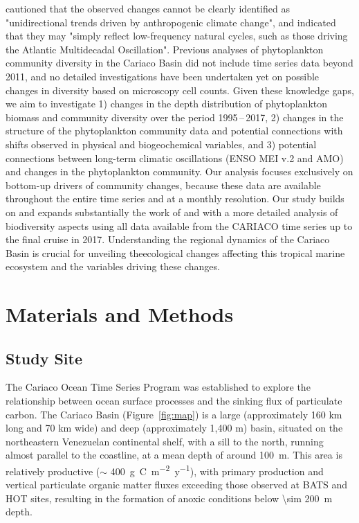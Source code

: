 \documentclass[draft]{agujournal2019}
\begin{document}
     cautioned that the observed changes cannot be clearly identified as "unidirectional trends driven by anthropogenic climate change", and indicated that they may "simply reflect low-frequency natural cycles, such as those driving the Atlantic Multidecadal Oscillation".
    Previous analyses of phytoplankton community diversity in the Cariaco Basin did not include time series data beyond 2011, and no detailed investigations have been undertaken yet on possible changes in diversity based on microscopy cell counts.
    Given these knowledge gaps, we aim to investigate 1) changes in the depth distribution of phytoplankton biomass and community diversity over the period 1995\,--\,2017, 2) changes in the structure of the phytoplankton community data and potential connections with shifts observed in physical and biogeochemical variables, and 3) potential connections between long-term climatic oscillations (ENSO MEI v.2 and AMO)  and changes in the phytoplankton community.
    Our analysis focuses exclusively on bottom-up drivers of community changes, because these data are available throughout the entire time series and at a monthly resolution. Our study builds on and expands substantially the work of  and  with a more detailed analysis of biodiversity aspects using all data available from the CARIACO time series up to the final cruise in 2017. Understanding the regional dynamics of the Cariaco Basin is crucial for unveiling theecological changes affecting this tropical marine ecosystem and the variables driving these changes. 
        
   


\section{Materials and Methods}
%
\subsection{Study Site}
    The Cariaco Ocean Time Series Program was established to explore the relationship between ocean surface processes and the sinking flux of particulate carbon. The Cariaco Basin (Figure~\ref{fig:map}) is a large (approximately 160 km long and 70 km wide) and deep (approximately 1,400 m) basin, situated on the northeastern Venezuelan continental shelf, with a sill to the north, running almost parallel to the coastline, at a mean depth of around \qty{100}{m}. This area is relatively productive ($\sim$ \qty{400}{g.C.m^{-2}.y^{-1}}), with primary production and vertical particulate organic matter fluxes exceeding those observed at BATS and HOT sites, resulting in the formation of anoxic conditions below \qty{\sim 200}{m} depth.
\end{document}
